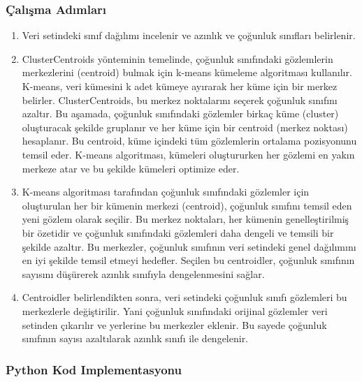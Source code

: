 \subsubsection{Çalışma Adımları}

\begin{enumerate}
    \item Veri setindeki sınıf dağılımı incelenir ve azınlık ve çoğunluk sınıfları belirlenir.
    \item ClusterCentroids yönteminin temelinde, çoğunluk sınıfındaki gözlemlerin merkezlerini (centroid) bulmak için k-means kümeleme algoritması kullanılır. K-means, veri kümesini k adet kümeye ayırarak her küme için bir merkez belirler. ClusterCentroids, bu merkez noktalarını seçerek çoğunluk sınıfını azaltır. Bu aşamada, çoğunluk sınıfındaki gözlemler birkaç küme (cluster) oluşturacak şekilde gruplanır ve her küme için bir centroid (merkez noktası) hesaplanır. Bu centroid, küme içindeki tüm gözlemlerin ortalama pozisyonunu temsil eder. K-means algoritması, kümeleri oluştururken her gözlemi en yakın merkeze atar ve bu şekilde kümeleri optimize eder.
    \item K-means algoritması tarafından çoğunluk sınıfındaki gözlemler için oluşturulan her bir kümenin merkezi (centroid), çoğunluk sınıfını temsil eden yeni gözlem olarak seçilir. Bu merkez noktaları, her kümenin genelleştirilmiş bir özetidir ve çoğunluk sınıfındaki gözlemleri daha dengeli ve temsili bir şekilde azaltır. Bu merkezler, çoğunluk sınıfının veri setindeki genel dağılımını en iyi şekilde temsil etmeyi hedefler. Seçilen bu centroidler, çoğunluk sınıfının sayısını düşürerek azınlık sınıfıyla dengelenmesini sağlar.
    \item Centroidler belirlendikten sonra, veri setindeki çoğunluk sınıfı gözlemleri bu merkezlerle değiştirilir. Yani çoğunluk sınıfındaki orijinal gözlemler veri setinden çıkarılır ve yerlerine bu merkezler eklenir. Bu sayede çoğunluk sınıfının sayısı azaltılarak azınlık sınıfı ile dengelenir.
\end{enumerate}

\subsubsection{Python Kod Implementasyonu}

